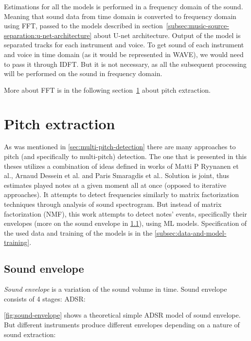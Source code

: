 Estimations for all the models is performed in a frequency domain of the sound. Meaning that sound data from time domain
is converted to frequency domain using \ac{FFT}, passed to the models described in section~\ref{subsec:music-source-separation:u-net-architecture}
about U-net architecture. Output of the model is separated tracks for each instrument and voice. To get sound of each
instrument and voice in time domain (as it would be represented in \ac{WAVE}), we would need to pass it through
\ac{IDFT}. But it is not necessary, as all the subsequent processing will be performed on the sound in frequency domain.

More about \ac{FFT} is in the following section~\ref{sec:pitch-extraction} about pitch extraction.

\section{Pitch extraction}\label{sec:pitch-extraction}
As was mentioned in \cref{sec:multi-pitch-detection} there are many approaches to pitch (and specifically
to multi-pitch) detection. The one that is presented in this theses utilizes a combination of ideas defined in works
of Matti P Ryynanen et al.\cite{ryynanen2005polyphonic}, Arnaud Dessein et al.\cite{dessein2010real} and Paris Smaragdis
et al.\cite{smaragdis2003non}. Solution is joint, thus estimates played notes at a given moment all at once (opposed to
iterative approaches). It attempts to detect frequencies similarly to matrix factorization techniques through analysis
of sound spectrogram. But instead of matrix factorization (\ac{NMF}), this work attempts to detect notes' events,
specifically their envelopes (more on the sound envelope in \cref{subsec:sound-envelope}), using \ac{ML} models.
Specification of the used data and training of the models is in the \cref{subsec:data-and-model-training}.

\pagebreak

\subsection{Sound envelope}\label{subsec:sound-envelope}
\textit{Sound envelope} is a variation of the sound volume in time\cite{dregvaite2015information}. Sound envelope
consists of 4 stages: \ac{ADSR}:


\cref{fig:sound-envelope} shows a theoretical simple \ac{ADSR} model of sound envelope. But different instruments
produce different envelopes depending on a nature of sound extraction:

